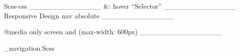 Scss-css
______________
&: hover
“Selector”
______________
 Responsive Design
 nav
 absolute
______________

@media only screen and (max-width: 600px)
________________

_navigation.Scss